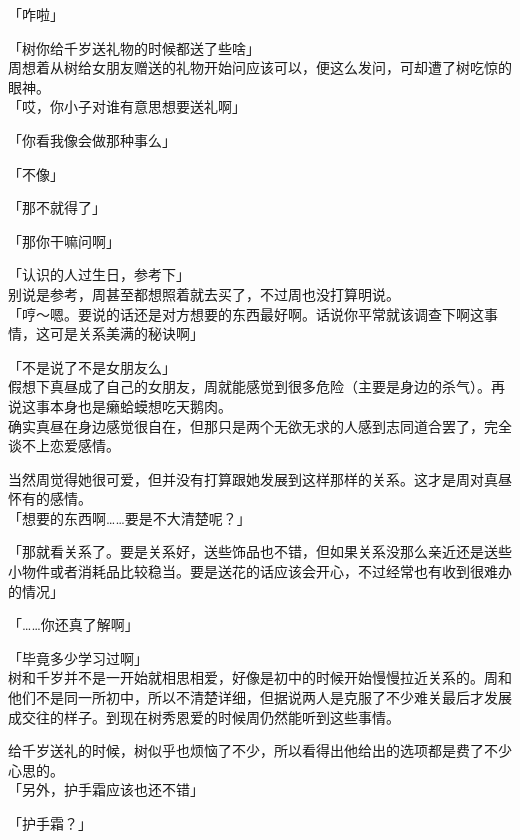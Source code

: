 「咋啦」

「树你给千岁送礼物的时候都送了些啥」\\

周想着从树给女朋友赠送的礼物开始问应该可以，便这么发问，可却遭了树吃惊的眼神。\\

「哎，你小子对谁有意思想要送礼啊」

「你看我像会做那种事么」

「不像」

「那不就得了」

「那你干嘛问啊」

「认识的人过生日，参考下」\\

别说是参考，周甚至都想照着就去买了，不过周也没打算明说。\\

「哼～嗯。要说的话还是对方想要的东西最好啊。话说你平常就该调查下啊这事情，这可是关系美满的秘诀啊」

「不是说了不是女朋友么」\\

假想下真昼成了自己的女朋友，周就能感觉到很多危险（主要是身边的杀气）。再说这事本身也是癞蛤蟆想吃天鹅肉。\\

确实真昼在身边感觉很自在，但那只是两个无欲无求的人感到志同道合罢了，完全谈不上恋爱感情。

当然周觉得她很可爱，但并没有打算跟她发展到这样那样的关系。这才是周对真昼怀有的感情。\\

「想要的东西啊……要是不大清楚呢？」

「那就看关系了。要是关系好，送些饰品也不错，但如果关系没那么亲近还是送些小物件或者消耗品比较稳当。要是送花的话应该会开心，不过经常也有收到很难办的情况」

「……你还真了解啊」

「毕竟多少学习过啊」\\

树和千岁并不是一开始就相思相爱，好像是初中的时候开始慢慢拉近关系的。周和他们不是同一所初中，所以不清楚详细，但据说两人是克服了不少难关最后才发展成交往的样子。到现在树秀恩爱的时候周仍然能听到这些事情。

给千岁送礼的时候，树似乎也烦恼了不少，所以看得出他给出的选项都是费了不少心思的。\\

「另外，护手霜应该也还不错」

「护手霜？」\\

